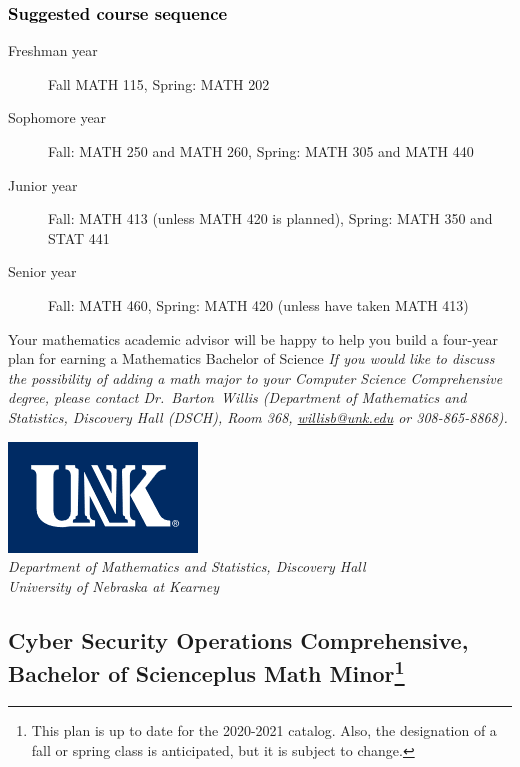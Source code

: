 \documentclass[10pt]{article}
\makeatletter
\newenvironment{mypar}[2]
   {\begin{list}{}%
     {\setlength\leftmargin{#1}
     \setlength\rightmargin{#2}}
     \item[]}
   {\end{list}}
\newcommand{\contactbw}{\mbox{Dr.\ Barton Willis} (Department of Mathematics and Statistics,  Discovery Hall (DSCH), Room 368,
\href{mailto:willisb@unk.edu}{willisb@unk.edu} or 308-865-8868)}
\makeatother
\begin{document}
\begin{center} \fbox{
  {\textcolor{unkblue}{For a suggested course sequence, see the next page.}}}
\end{center}
\subsubsection*{\textcolor{black}{Suggested course sequence}}

\begin{description}
   \item[\phantom{xxx} Freshman year] Fall MATH 115, Spring: MATH 202
      \item[\phantom{xxx} Sophomore year]  Fall: MATH 250 and MATH 260,   Spring: MATH 305 and MATH 440
     \item[\phantom{xxx} Junior year]  Fall: MATH 413 (unless MATH 420 is planned),  Spring: MATH 350 and STAT 441
      \item[\phantom{xxx} Senior year]  Fall: MATH 460,  Spring: MATH 420 (unless have taken MATH 413)
 \end{description}

\begin{mypar}{0.5cm}{0.5cm}  Your mathematics academic advisor will be happy to help you build a four-year plan for earning a Mathematics Bachelor of Science  \textcolor{unkblue}{\emph{If you would like to discuss the possibility of  adding a math major to your Computer Science Comprehensive degree, please contact \contactbw.}}
\end{mypar}
\newpage


\begin{flushleft}
\includegraphics[scale=0.25]{unk-logo}\\
 \emph{\textcolor{unkblue}{Department of Mathematics and Statistics, Discovery Hall}} \\
  \emph{\textcolor{unkblue}{University of Nebraska at Kearney}}
\end{flushleft}


\subsection*{\textbf{\textcolor{unkblue}{Cyber Security Operations Comprehensive, Bachelor of Scienceplus Math Minor\footnote[1]{This plan is up to date for the 2020-2021 catalog. Also, the designation of a fall or spring class is anticipated, but it is subject to change.
}}}}
\end{document}

